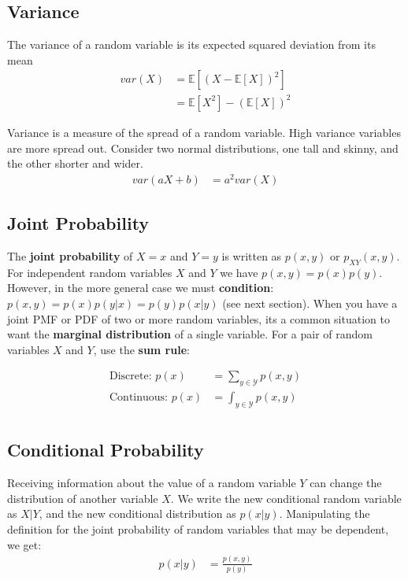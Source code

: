 \documentclass{harvardml}
\theoremstyle{definition}
\theoremstyle{plain}
\newcommand{\E}{\mathbb{E}}
\newcommand{\mcY}{\mathcal{Y}}
\begin{document}
	\subsection{Variance}
		The variance of a random variable is its expected squared 
		deviation from its mean
			\begin{align*}
				var(X) &= \E[ (X - \E[X])^2 ] \\ 
					   &= \E[X^2] - (\E[X])^2
			\end{align*}

		\noindent Variance is a measure of the spread of a random 
		variable. High variance variables are more spread out. 
		Consider two normal distributions, one tall and skinny, 
		and the other shorter and wider.
		\begin{align*}
			var(aX + b) &= a^2var(X)
		\end{align*}

    \subsection{Joint Probability}

        The \textbf{joint probability} of $X=x$ and $Y=y$ is written 
		as $p(x,y)$ or $p_{XY}(x,y)$. For independent random variables 
		$X$ and $Y$ we have $p(x,y) = p(x)p(y)$. However, in the more 
		general case we must \textbf{condition}: $p(x,y) = p(x)p(y|x) = 
		p(y)p(x|y)$ (see next section). When you have a joint PMF or PDF 
		of two or more random variables, its a common situation to want 
		the \textbf{marginal distribution} of a single variable. For a 
		pair of random variables $X$ and $Y$, use the \textbf{sum rule}:

        \begin{align*}
            \text{Discrete: } p(x) &= \sum_{y \in \mcY} p(x,y)\\
            \text{Continuous: } p(x) &= \int_{y \in \mcY} p(x,y)\\
        \end{align*}

    \subsection{Conditional Probability}
		Receiving information about the value of a random variable $Y$ 
		can change the distribution of another variable $X$. We write the 
		new conditional random variable as $X|Y$, and the new conditional 
		distribution as $p(x|y)$. Manipulating the definition for the 
		joint probability of random variables that may be dependent, 
		we get:
			\begin{align*}
				p(x|y) &= \frac{p(x,y)}{p(y)}
			\end{align*}
\end{document}
